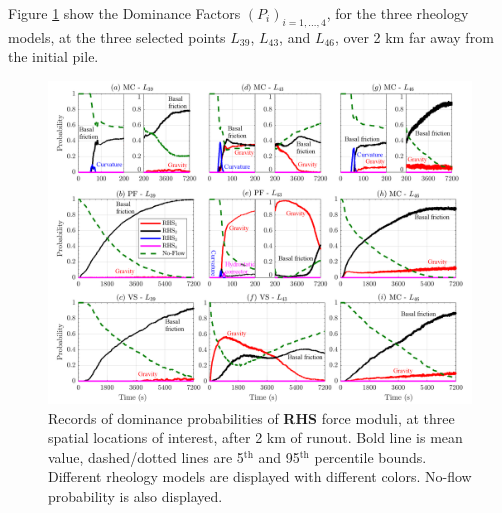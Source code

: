 \documentclass{article}
\begin{document}
Figure \ref{fig:Colima-Pr2} show the Dominance Factors $(P_i)_{i=1,\dots,4}$, for the three rheology models, at the three selected points $L_{39}$, $L_{43}$, and $L_{46}$, over 2 km far away from the initial pile.
\begin{figure}[H]
         \centering
        \includegraphics[width=1\textwidth]{BAF_VolcanDeColima/ForceContrib/Pr2_total.png}
        \caption{Records of dominance probabilities of \textbf{RHS} force moduli, at three spatial locations of interest, after 2 km of runout. Bold line is mean value, dashed/dotted lines are 5$^{\mathrm{th}}$ and 95$^{\mathrm{th}}$ percentile bounds. Different rheology models are displayed with different colors. No-flow probability is also displayed.}
        \label{fig:Colima-Pr2}
\end{figure}
\end{document}

